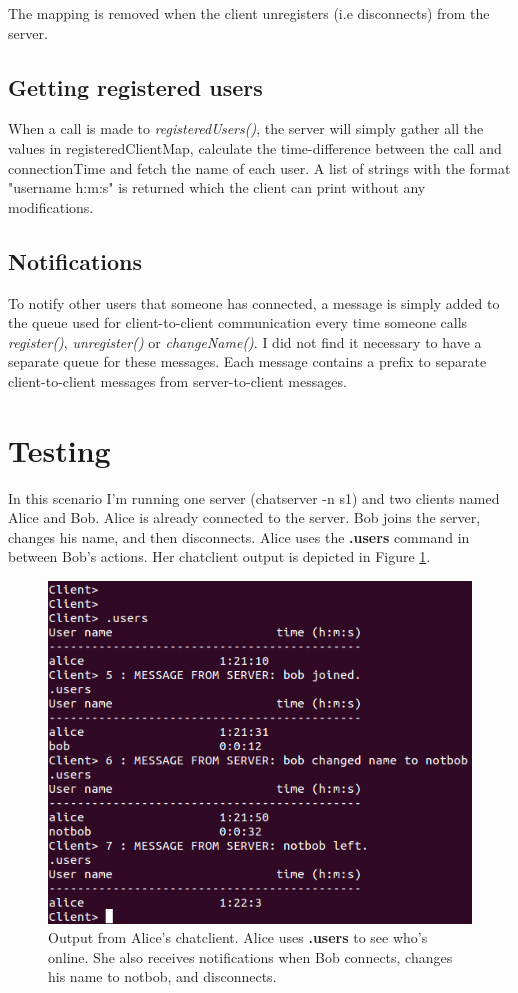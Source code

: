 \documentclass[conference, a4paper]{IEEEtran}
\begin{document}
The mapping is removed when the client unregisters (i.e disconnects) from the server.

\subsection{Getting registered users}
When a call is made to \textit{registeredUsers()}, the server will simply gather all the values in registeredClientMap, calculate the time-difference between the call and connectionTime and fetch the name of each user. A list of strings with the format "username h:m:s" is returned which the client can print without any modifications.

\subsection{Notifications}
To notify other users that someone has connected, a message is simply added to the queue used for client-to-client communication every time someone calls \textit{register()}, \textit{unregister()} or \textit{changeName()}. I did not find it necessary to have a separate queue for these messages. Each message contains a prefix to separate client-to-client messages from server-to-client messages.

\section{Testing}
In this scenario I'm running one server (chatserver -n s1) and two clients named Alice and Bob. Alice is already connected to the server. Bob joins the server, changes his name, and then disconnects. Alice uses the \textbf{.users} command in between Bob's actions. Her chatclient output is depicted in Figure \ref{testalicebob}.

\begin{figure}[h!]
	\centering
	\includegraphics[scale=0.5]{conversation}
	\caption{Output from Alice's chatclient. Alice uses \textbf{.users} to see who's online. She also receives notifications when Bob connects, changes his name to notbob, and disconnects.}
	\label{testalicebob}
\end{figure}
\end{document}
